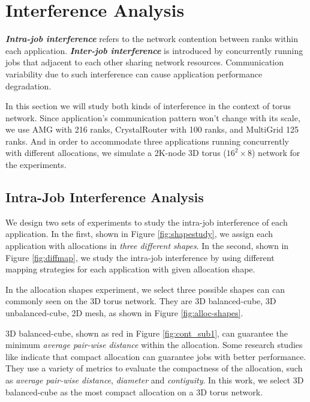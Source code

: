 \section{Interference Analysis}
\label{sec:interference}

\textbf{\emph{Intra-job interference}} refers to the network contention between ranks within each application. \textbf{\emph{Inter-job interference}} is introduced by concurrently running jobs that adjacent to each other sharing network resources. Communication variability due to such interference can cause application performance degradation.

In this section we will study both kinds of interference in the context of torus network. 
Since application's communication pattern won't change with its scale, we use AMG with 216 ranks, CrystalRouter with 100 ranks, and MultiGrid 125 ranks. And in order to accommodate three applications running concurrently with different allocations, we simulate a 2K-node 3D torus ($16^{2} \times 8$) network for the experiments.


\subsection{Intra-Job Interference Analysis}
\label{sec: introjob}

We design two sets of experiments to study the intra-job interference of each application. In the first, shown in Figure \ref{fig:shapestudy}, we assign each application with allocations in \emph{three different shapes}.  In the second, shown in Figure \ref{fig:diffmap}, we study the intra-job interference by using different mapping strategies for each application with given allocation shape. 

In the allocation shapes experiment, we select three possible shapes can can commonly seen on the 3D torus network. They are 3D balanced-cube, 3D unbalanced-cube, 2D mesh, as shown in Figure \ref{fig:alloc-shapes}.

3D balanced-cube, shown as red in Figure \ref{fig:cont_sub1}, can guarantee the minimum \emph{average pair-wise distance} within the allocation. Some research studies like \cite{leung,abhinav-sc13} indicate that compact allocation can guarantee jobs with better performance. They use a variety of metrics to evaluate the compactness of the allocation, such as \emph{average pair-wise distance}, \emph{diameter} and \emph{contiguity}. In this work, we select 3D balanced-cube as the most compact allocation on a 3D torus network.

